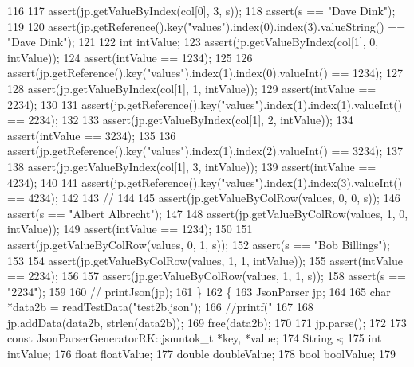 \begin{DoxyCode}
116 
117         assert(jp.getValueByIndex(col[0], 3, s));
118         assert(s == \textcolor{stringliteral}{"Dave Dink"});
119 
120         assert(jp.getReference().key(\textcolor{stringliteral}{"values"}).index(0).index(3).valueString() == \textcolor{stringliteral}{"Dave Dink"});
121 
122         \textcolor{keywordtype}{int} intValue;
123         assert(jp.getValueByIndex(col[1], 0, intValue));
124         assert(intValue == 1234);
125 
126         assert(jp.getReference().key(\textcolor{stringliteral}{"values"}).index(1).index(0).valueInt() == 1234);
127 
128         assert(jp.getValueByIndex(col[1], 1, intValue));
129         assert(intValue == 2234);
130 
131         assert(jp.getReference().key(\textcolor{stringliteral}{"values"}).index(1).index(1).valueInt() == 2234);
132 
133         assert(jp.getValueByIndex(col[1], 2, intValue));
134         assert(intValue == 3234);
135 
136         assert(jp.getReference().key(\textcolor{stringliteral}{"values"}).index(1).index(2).valueInt() == 3234);
137 
138         assert(jp.getValueByIndex(col[1], 3, intValue));
139         assert(intValue == 4234);
140 
141         assert(jp.getReference().key(\textcolor{stringliteral}{"values"}).index(1).index(3).valueInt() == 4234);
142 
143         \textcolor{comment}{//}
144 
145         assert(jp.getValueByColRow(values, 0, 0, s));
146         assert(s == \textcolor{stringliteral}{"Albert Albrecht"});
147 
148         assert(jp.getValueByColRow(values, 1, 0, intValue));
149         assert(intValue == 1234);
150 
151         assert(jp.getValueByColRow(values, 0, 1, s));
152         assert(s == \textcolor{stringliteral}{"Bob Billings"});
153 
154         assert(jp.getValueByColRow(values, 1, 1, intValue));
155         assert(intValue == 2234);
156 
157         assert(jp.getValueByColRow(values, 1, 1, s));
158         assert(s == \textcolor{stringliteral}{"2234"});
159 
160         \textcolor{comment}{// printJson(jp);}
161     \}
162     \{
163         JsonParser jp;
164 
165         \textcolor{keywordtype}{char} *data2b = readTestData(\textcolor{stringliteral}{"test2b.json"});
166         \textcolor{comment}{//printf("%
167 
168         jp.addData(data2b, strlen(data2b));
169         free(data2b);
170 
171         jp.parse();
172 
173         \textcolor{keyword}{const} JsonParserGeneratorRK::jsmntok_t *key, *value;
174         String s;
175         \textcolor{keywordtype}{int} intValue;
176         \textcolor{keywordtype}{float} floatValue;
177         \textcolor{keywordtype}{double} doubleValue;
178         \textcolor{keywordtype}{bool} boolValue;
179 
}
\end{DoxyCode}
